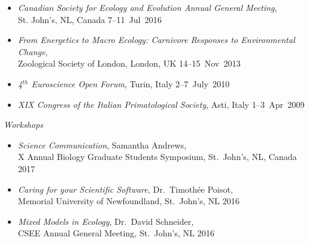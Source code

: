 
\vspace{7pt}

\begin{itemize}
  \item \emph{Canadian Society for Ecology and Evolution Annual General Meeting},\\ St. John's, NL, Canada \hfill{7--11~Jul~2016}
  \item \emph{From Energetics to Macro Ecology: Carnivore Responses to Environmental Change},\\ Zoological Society of London, London, UK \hfill{14--15~Nov~2013}
  \item \emph{4$^{th}$ Euroscience Open Forum}, Turin, Italy \hfill{2--7~July~2010}
  \item \emph{XIX Congress of the Italian Primatological Society}, Asti, Italy \hfill{1--3~Apr~2009}
\end{itemize}

\medskip
\emph{Workshops}
\begin{itemize}
  \item \emph{Science Communication}, Samantha Andrews,\\ X Annual Biology Graduate Students Symposium, St.\ John's, NL, Canada \hfill{2017}
  \item \emph{Caring for your Scientific Software}, Dr.~Timoth\'{e}e Poisot,\\ Memorial University of Newfoundland, St.\ John's, NL \hfill{2016}
  \item \emph{Mixed Models in Ecology}, Dr.~David Schneider,\\ CSEE Annual General Meeting, St.\ John's, NL \hfill{2016}
\end{itemize}
